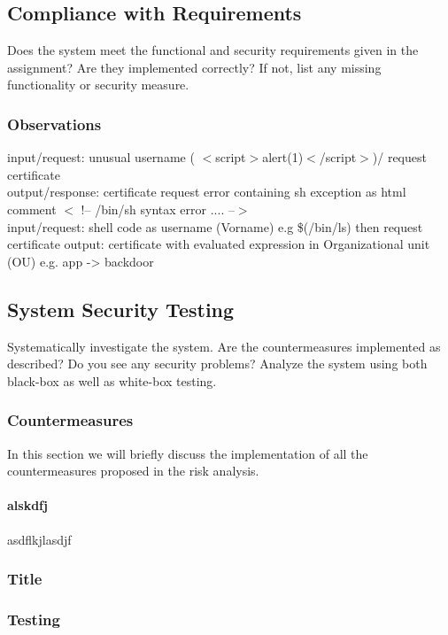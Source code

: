 \documentclass[english]{article}
\begin{document}
\subsection{Compliance with Requirements} 

Does the system meet the functional and security requirements given in the assignment? Are they implemented correctly? If not, list any missing functionality or security measure.

\subsubsection*{Observations}
input/request: unusual username ( $<$script$>$alert(1)$<$/script$>$)/ request certificate\\
output/response:  certificate request error containing sh exception as html comment $<$ !-- /bin/sh syntax error .... --$>$\\
input/request: shell code as username (Vorname) e.g \$(/bin/ls) then request certificate
output: certificate with evaluated expression in Organizational unit (OU) e.g. app -> backdoor


\subsection{System Security Testing}

Systematically investigate the system. Are the countermeasures implemented as described? Do you see any security problems? Analyze the system using both black-box as well as white-box testing.

\subsubsection{Countermeasures}
In this section we will briefly discuss the implementation of all the countermeasures proposed in the risk analysis.

\paragraph{alskdfj} asdflkjlasdjf



\subsubsection{Title}


\subsubsection{Testing}
\end{document}
